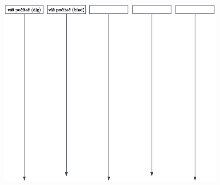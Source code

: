 \documentclass[a4paper,11pt]{article}
\begin{document}
\begin{figure}[h]
	\centering
	\includegraphics[bb=0 365 550 130, clip=true]{dia.eps}
\end{figure}
\end{document}
